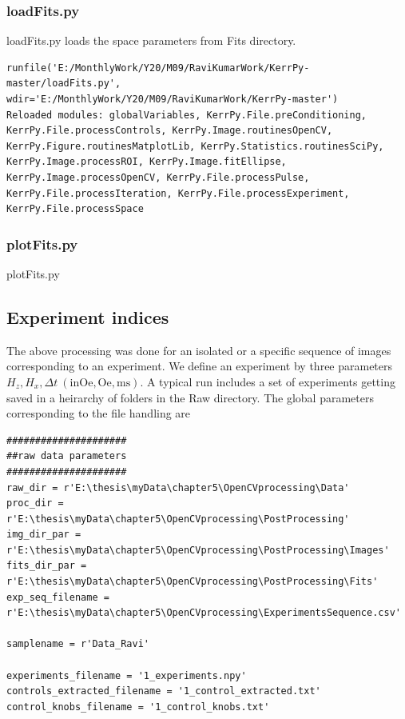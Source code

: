 \documentclass[12pt, twoside, a4paper]{article}
\begin{document}
\subsubsection{loadFits.py}
loadFits.py loads the space parameters from Fits directory.
\begin{verbatim}
runfile('E:/MonthlyWork/Y20/M09/RaviKumarWork/KerrPy-master/loadFits.py', wdir='E:/MonthlyWork/Y20/M09/RaviKumarWork/KerrPy-master')
Reloaded modules: globalVariables, KerrPy.File.preConditioning, KerrPy.File.processControls, KerrPy.Image.routinesOpenCV, KerrPy.Figure.routinesMatplotLib, KerrPy.Statistics.routinesSciPy, KerrPy.Image.processROI, KerrPy.Image.fitEllipse, KerrPy.Image.processOpenCV, KerrPy.File.processPulse, KerrPy.File.processIteration, KerrPy.File.processExperiment, KerrPy.File.processSpace
\end{verbatim}
%
\subsubsection{plotFits.py}
plotFits.py 
\subsection{Experiment indices}
The above processing was done for an isolated or a specific sequence of images corresponding to an experiment. We define an experiment by three parameters $H_z, H_x, \Delta t~\mathrm{(in Oe, Oe, ms)}$. A typical run includes a set of experiments getting saved in a heirarchy of folders in the Raw directory. The global parameters corresponding to the file handling are
%
\begin{verbatim}
#####################
##raw data parameters
#####################
raw_dir = r'E:\thesis\myData\chapter5\OpenCVprocessing\Data'
proc_dir = r'E:\thesis\myData\chapter5\OpenCVprocessing\PostProcessing'
img_dir_par = r'E:\thesis\myData\chapter5\OpenCVprocessing\PostProcessing\Images'
fits_dir_par = r'E:\thesis\myData\chapter5\OpenCVprocessing\PostProcessing\Fits'
exp_seq_filename = r'E:\thesis\myData\chapter5\OpenCVprocessing\ExperimentsSequence.csv'

samplename = r'Data_Ravi'

experiments_filename = '1_experiments.npy'
controls_extracted_filename = '1_control_extracted.txt'
control_knobs_filename = '1_control_knobs.txt'
\end{verbatim}
\end{document}
